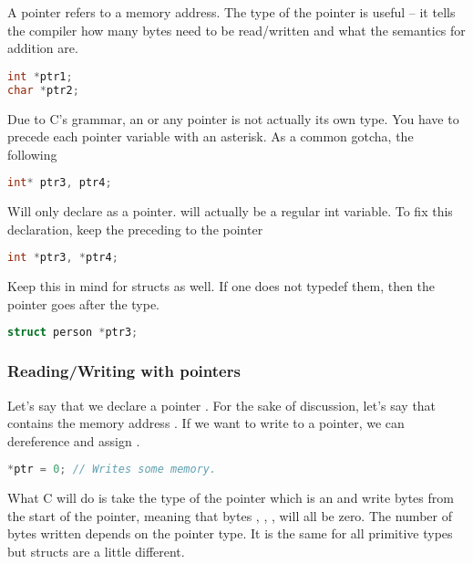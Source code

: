 A pointer refers to a memory address. The type of the pointer is useful -- it tells the compiler how many bytes need to be read/written and what the semantics for addition are.

\begin{lstlisting}[language=C]
int *ptr1;
char *ptr2;
\end{lstlisting}

Due to C's grammar, an  or any pointer is not actually its own type. You have to precede each pointer variable with an asterisk. As a common gotcha, the following

\begin{lstlisting}[language=C]
int* ptr3, ptr4;
\end{lstlisting}

Will only declare  as a pointer.
 will actually be a regular int variable.
To fix this declaration, keep the \keyword{*} preceding to the pointer

\begin{lstlisting}[language=C]
int *ptr3, *ptr4;
\end{lstlisting}

Keep this in mind for structs as well.
If one does not typedef them, then the pointer goes after the type.

\begin{lstlisting}[language=C]
struct person *ptr3;
\end{lstlisting}

\subsubsection{Reading/Writing with pointers}

Let's say that we declare a pointer . For the sake of discussion, let's say that  contains the memory address .
If we want to write to a pointer, we can dereference and assign .

\begin{lstlisting}[language=C]
*ptr = 0; // Writes some memory.
\end{lstlisting}

What C will do is take the type of the pointer which is an  and write  bytes from the start of the pointer, meaning that bytes , , ,  will all be zero.
The number of bytes written depends on the pointer type.
It is the same for all primitive types but structs are a little different.

